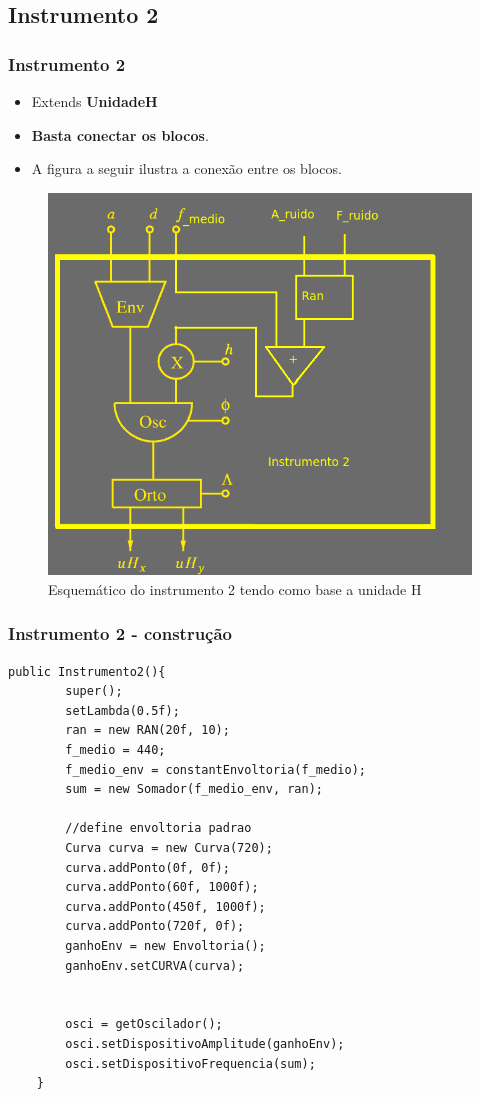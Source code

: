 \documentclass{beamer}
\begin{document}
\subsection{Instrumento 2}
\begin{frame}
 \frametitle{Instrumento 2}
 \begin{itemize}
 \item Extends \textbf{UnidadeH}
 \item \textbf{Basta conectar os blocos}.
 \item A figura a seguir ilustra a conexão entre os blocos.
 \end{itemize}
\end{frame}



\begin{frame}
 \begin{figure}
  \includegraphics[scale=0.4]{./images/instrumento2.png}
  \caption{Esquemático do instrumento 2 tendo como base a unidade H}
 \end{figure} 
\end{frame}
 \begin{frame}[fragile]
 \frametitle{Instrumento 2 - construção}
 	\begin{lstlisting}
public Instrumento2(){
		super();
		setLambda(0.5f);
		ran = new RAN(20f, 10);
		f_medio = 440;
		f_medio_env = constantEnvoltoria(f_medio);
		sum = new Somador(f_medio_env, ran);

		//define envoltoria padrao
		Curva curva = new Curva(720);
		curva.addPonto(0f, 0f);
		curva.addPonto(60f, 1000f);
		curva.addPonto(450f, 1000f);
		curva.addPonto(720f, 0f);
		ganhoEnv = new Envoltoria();
		ganhoEnv.setCURVA(curva);

		
		osci = getOscilador();
		osci.setDispositivoAmplitude(ganhoEnv);
		osci.setDispositivoFrequencia(sum);
	}
	    			\end{lstlisting}
\end{frame}
\end{document}
